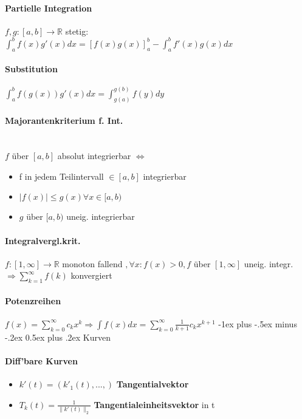 \documentclass[paper=a3,paper=landscape, fontsize=9pt,DIV=25]{scrartcl}
\makeatletter
\newcommand{\real}{{\mathbb{R}}}
\renewcommand{\section}{\@startsection{section}{1}{0mm}%
                                {-1ex plus -.5ex minus -.2ex}%
                                {0.5ex plus .2ex}%
                                {\normalfont\large\bfseries}}
\makeatother
\begin{document}
\begin{multicols*}{4}
        \paragraph{Partielle Integration}
        $f,g: [a,b] \rightarrow \real$ stetig: $\int_{a}^{b}f(x)g'(x)dx=[f(x)g(x)]_a^b-\int_{a}^{b}f'(x)g(x) dx$
        \paragraph{Substitution}
        $\int_{a}^{b}f(g(x))g'(x)dx=\int_{g(a)}^{g(b)}f(y)dy$
        \paragraph{Majorantenkriterium f. Int.}\hspace{0pt} \\
        $f$ über $[a,b]$ absolut integrierbar $\Leftrightarrow$
        \begin{itemize}
	        \item f in jedem Teilintervall $\in [a,b]$ integrierbar
                \item $\lvert f(x) \rvert \leq g(x) \forall x \in [a,b)$
                \item $g$ über $[a,b)$ uneig. integrierbar
        \end{itemize}
        \paragraph{Integralvergl.krit.}
        $f:[1,\infty]\rightarrow\real$ monoton fallend $, \forall x: f(x)>0, f$ über $[1,\infty]$ uneig. integr. $\Rightarrow \sum_{k=1}^{\infty}f(k)$ konvergiert
        \paragraph{Potenzreihen}
        $f(x)=\sum_{k=0}^{\infty}c_kx^k \Rightarrow \int f(x)dx=\sum_{k=0}^{\infty}\frac{1}{k+1}c_kx^{k+1}$
\section{Kurven}
\paragraph{Diff'bare Kurven}
\begin{itemize}
	\item $k'(t)=(k'_1(t),...,)$ \textbf{Tangentialvektor}
	\item $T_k(t)=\frac{1}{\lVert k'(t)\rVert_2}$ \textbf{Tangentialeinheitsvektor} in t
\end{itemize}

\end{multicols*}
\end{document}
